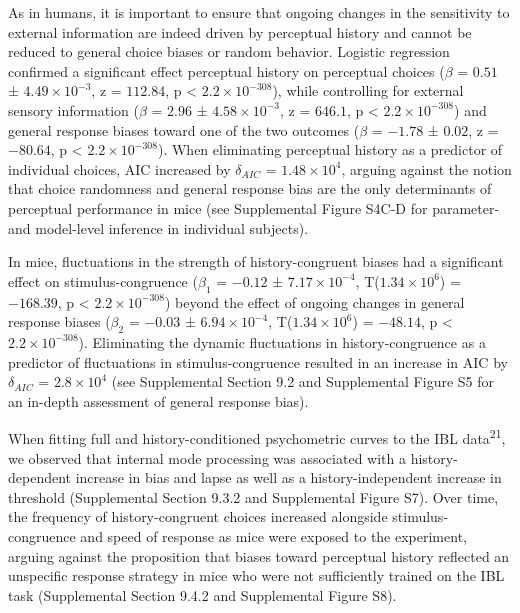 \documentclass[
]{article}
\begin{document}
As in humans, it is important to ensure that ongoing changes in the
sensitivity to external information are indeed driven by perceptual
history and cannot be reduced to general choice biases or random
behavior. Logistic regression confirmed a significant effect perceptual
history on perceptual choices (\(\beta\) = \(0.51\) ±
\(\ensuremath{4.49\times 10^{-3}}\), z = \(112.84\), p < \(\ensuremath{2.2\times 10^{-308}}\)), while
controlling for external sensory information (\(\beta\) = \(2.96\) ±
\(\ensuremath{4.58\times 10^{-3}}\), z = \(646.1\), p < \(\ensuremath{2.2\times 10^{-308}}\)) and
general response biases toward one of the two outcomes (\(\beta\) =
\(-1.78\) ± \(0.02\), z = \(-80.64\), p < \(\ensuremath{2.2\times 10^{-308}}\)). When eliminating
perceptual history as a predictor of individual choices, AIC increased
by \(\delta_{AIC}\) = \(\ensuremath{1.48\times 10^{4}}\), arguing
against the notion that choice randomness and general response bias are
the only determinants of perceptual performance in mice (see
Supplemental Figure S4C-D for parameter- and model-level inference in
individual subjects).

In mice, fluctuations in the strength of history-congruent biases had a
significant effect on stimulus-congruence (\(\beta_1\) = \(-0.12\) ±
\(\ensuremath{7.17\times 10^{-4}}\),
T(\(\ensuremath{1.34\times 10^{6}}\)) = \(-168.39\), p < \(\ensuremath{2.2\times 10^{-308}}\)) beyond
the effect of ongoing changes in general response biases (\(\beta_2\) =
\(-0.03\) ± \(\ensuremath{6.94\times 10^{-4}}\),
T(\(\ensuremath{1.34\times 10^{6}}\)) = \(-48.14\), p < \(\ensuremath{2.2\times 10^{-308}}\)).
Eliminating the dynamic fluctuations in history-congruence as a
predictor of fluctuations in stimulus-congruence resulted in an increase
in AIC by \(\delta_{AIC}\) = \(\ensuremath{2.8\times 10^{4}}\) (see
Supplemental Section 9.2 and Supplemental Figure S5 for an in-depth
assessment of general response bias).

When fitting full and history-conditioned psychometric curves to the IBL
data\textsuperscript{21}, we observed that internal mode processing was
associated with a history-dependent increase in bias and lapse as well
as a history-independent increase in threshold (Supplemental Section
9.3.2 and Supplemental Figure S7). Over time, the frequency of
history-congruent choices increased alongside stimulus-congruence and
speed of response as mice were exposed to the experiment, arguing
against the proposition that biases toward perceptual history reflected
an unspecific response strategy in mice who were not sufficiently
trained on the IBL task (Supplemental Section 9.4.2 and Supplemental
Figure S8).
\end{document}

